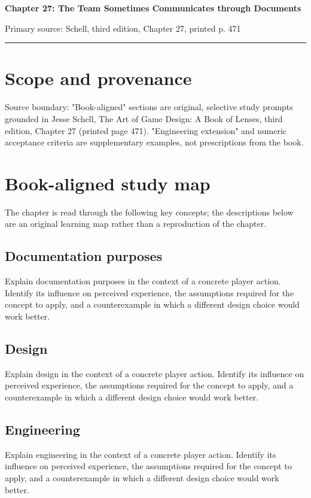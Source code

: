 \documentclass[11pt]{article}
\begin{document}
{\huge\bfseries\color{suiteblue} Chapter 27: The Team Sometimes Communicates through Documents}\par
\vspace{0.15in}
{\normalsize\color{suitegray} Primary source: Schell, third edition, Chapter 27, printed p. 471}\par
\vspace{0.15in}\hrule\vspace{0.15in}

\section{Scope and provenance}
Source boundary: "Book-aligned" sections are original, selective study prompts grounded in Jesse Schell, The Art of Game Design: A Book of Lenses, third edition, Chapter 27 (printed page 471). "Engineering extension" and numeric acceptance criteria are supplementary examples, not prescriptions from the book.


\section{Book-aligned study map}
The chapter is read through the following key concepts; the descriptions below are an original learning map rather than a reproduction of the chapter.


\subsection{Documentation purposes}
Explain documentation purposes in the context of a concrete player action. Identify its influence on perceived experience, the assumptions required for the concept to apply, and a counterexample in which a different design choice would work better.


\subsection{Design}
Explain design in the context of a concrete player action. Identify its influence on perceived experience, the assumptions required for the concept to apply, and a counterexample in which a different design choice would work better.


\subsection{Engineering}
Explain engineering in the context of a concrete player action. Identify its influence on perceived experience, the assumptions required for the concept to apply, and a counterexample in which a different design choice would work better.
\end{document}
